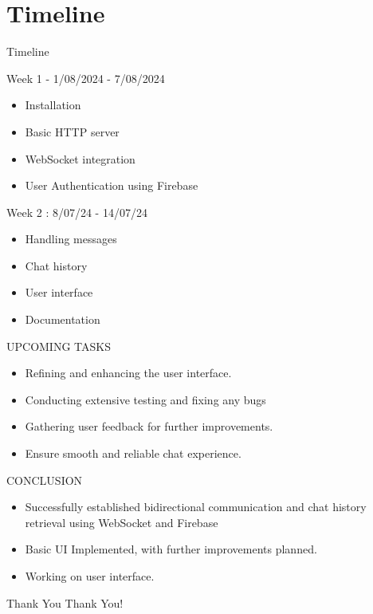 \documentclass{beamer}
\begin{document}
\section{Timeline}
\begin{frame}{Timeline}
    \begin{block}{Week 1 - 1/08/2024 - 7/08/2024}
        \begin{itemize}
            \item Installation
            \item Basic HTTP server
            \item WebSocket integration
            \item User Authentication using Firebase
        \end{itemize}
    \end{block}
    
    \begin{block}{Week 2 : 8/07/24 - 14/07/24}
        \begin{itemize}
            \item Handling messages
            \item Chat history 
            \item User interface
            \item Documentation
        \end{itemize}
    \end{block}
\end{frame}

\begin{frame}{UPCOMING TASKS}
    \begin{itemize}
        \item Refining and enhancing the user interface.
        \item Conducting extensive testing and fixing any bugs
        \item Gathering user feedback for further improvements.
        \item Ensure smooth and reliable chat experience. 
    \end{itemize}
\end{frame}

\begin{frame}{CONCLUSION}
    \begin{itemize}
        \item Successfully established bidirectional communication and chat history retrieval using WebSocket and Firebase
        \item Basic UI Implemented, with further improvements planned.
        \item Working on user interface.
    \end{itemize}
\end{frame}

\begin{frame}{Thank You}
    \centering
    \Huge Thank You!
\end{frame}
\end{document}
